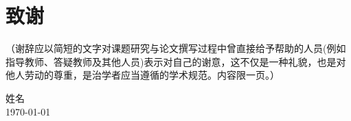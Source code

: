 \chapter{致谢}

	
	（谢辞应以简短的文字对课题研究与论文撰写过程中曾直接给予帮助的人员(例如指导教师、答疑教师及其他人员)表示对自己的谢意，这不仅是一种礼貌，也是对他人劳动的尊重，是治学者应当遵循的学术规范。内容限一页。）

\vskip 108pt
\begin{flushright}
	姓名\makebox[2.5cm]{} \\
	\today
\end{flushright}

